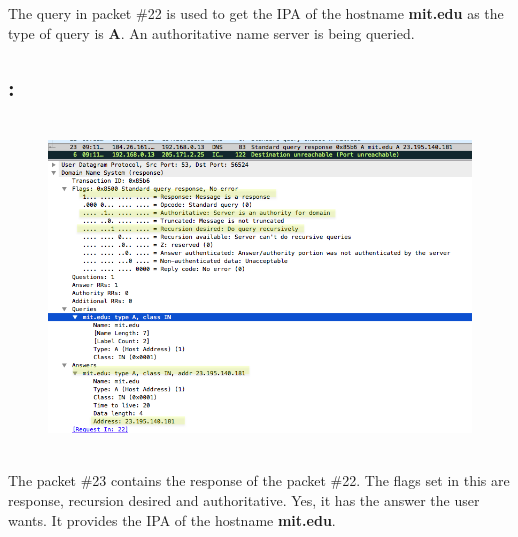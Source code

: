 \documentclass[]{report}
\begin{document}
The query in packet \#22 is used to get the IPA of the hostname \textbf{mit.edu}  as the type of query is \textbf{A}. An authoritative name server is being queried. 

\subsection{:}
\begin{figure}[H]
	\vspace{0pt}
	\includegraphics[height = 250pt, keepaspectratio]{Snapshots/q3/3_10.png}
\end{figure}

The packet \#23 contains the response of the packet \#22. The flags set in this are response, recursion desired and authoritative. Yes, it has the answer the user wants. It provides the IPA of the hostname \textbf{mit.edu}.
\end{document}
